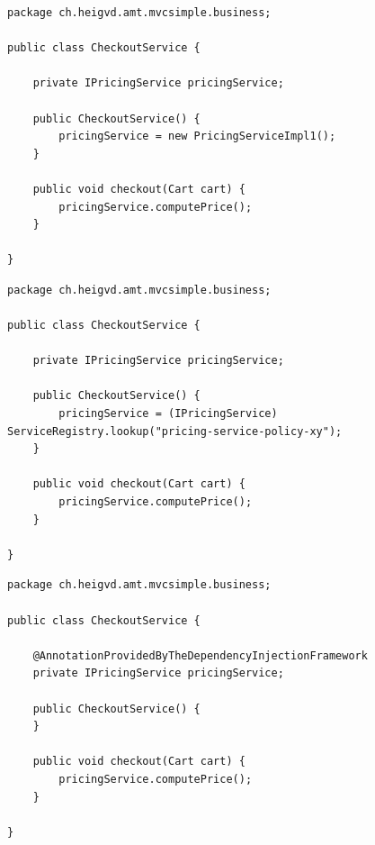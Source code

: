 \vspace{10pt}
\begin{minipage}{\linewidth}
\begin{lstlisting}[frame=single]
package ch.heigvd.amt.mvcsimple.business;

public class CheckoutService {

    private IPricingService pricingService;

    public CheckoutService() {
        pricingService = new PricingServiceImpl1();
    }

    public void checkout(Cart cart) {
        pricingService.computePrice();
    }

}
\end{lstlisting}
\end{minipage}


\vspace{10pt}
\begin{minipage}{\linewidth}
\begin{lstlisting}[frame=single]
package ch.heigvd.amt.mvcsimple.business;

public class CheckoutService {

    private IPricingService pricingService;

    public CheckoutService() {
        pricingService = (IPricingService) ServiceRegistry.lookup("pricing-service-policy-xy");
    }

    public void checkout(Cart cart) {
        pricingService.computePrice();
    }

}
\end{lstlisting}
\end{minipage}

\vspace{10pt}
\begin{minipage}{\linewidth}
\begin{lstlisting}[frame=single]
package ch.heigvd.amt.mvcsimple.business;

public class CheckoutService {

    @AnnotationProvidedByTheDependencyInjectionFramework
    private IPricingService pricingService;

    public CheckoutService() {
    }

    public void checkout(Cart cart) {
        pricingService.computePrice();
    }

}\end{lstlisting}
\end{minipage}


